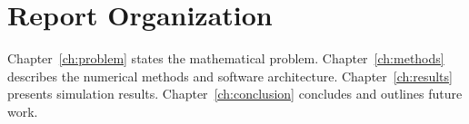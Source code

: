 \section{Report Organization}

Chapter~\ref{ch:problem} states the mathematical problem.
Chapter~\ref{ch:methods} describes the numerical methods and software
architecture.
Chapter~\ref{ch:results} presents simulation results.
Chapter~\ref{ch:conclusion} concludes and outlines future work.

